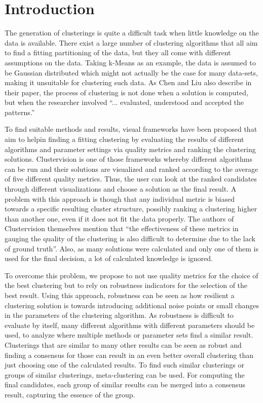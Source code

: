 \iffalse  \fi

\chapter{Introduction}
\label{cha:Introduction}

The generation of clusterings is quite a difficult task when little knowledge on the data is available. There exist a large number of clustering algorithms that all aim to find a fitting partitioning of the data, but they all come with different assumptions on the data. Taking k-Means as an example, the data is assumed to be Gaussian distributed which might not actually be the case for many data-sets, making it unsuitable for clustering such data. As Chen and Liu \cite{VISTA} also describe in their paper, the process of clustering is not done when a solution is computed, but when the researcher involved ``... evaluated, understood and accepted the patterns.''

To find suitable methods and results, visual frameworks have been proposed that aim to helpin  finding a fitting clustering by evaluating the results of different algorithms and parameter settings via quality metrics and ranking the clustering solutions. Clustervision \cite{Kwon2018ClustervisionVS} is one of those frameworks whereby different algorithms can be run and their solutions are visualized and ranked according to the average of five different quality metrics. Thus, the user can look at the ranked candidates through different visualizations and choose a solution as the final result. A problem with this approach is though that any individual metric is biased towards a specific resulting cluster structure, possibly ranking a clustering higher than another one, even if it does not fit the data properly. The authors of Clustervision themselves mention that ``the effectiveness of these metrics in gauging the quality of the clustering is also difficult to determine due to the lack of ground truth''. Also, as many solutions were calculated and only one of them is used for the final decision, a lot of calculated knowledge is ignored.

To overcome this problem, we propose to not use quality metrics for the choice of the best clustering but to rely on robustness indicators for the selection of the best result. Using this approach, robustness can be seen as how resilient a clustering solution is towards introducing additional noise points or small changes in the parameters of the clustering algorithm. As robustness is difficult to evaluate by itself, many different algorithms with different parameters should be used, to analyze where multiple methods or parameter sets find a similar result. Clusterings that are similar to many other results can be seen as robust and finding a consensus for those can result in an even better overall clustering than just choosing one of the calculated results. To find such similar clusterings or groups of similar clusterings, meta-clustering can be used. For computing the final candidates, each group of similar results can be merged into a consensus result, capturing the essence of the group. 

